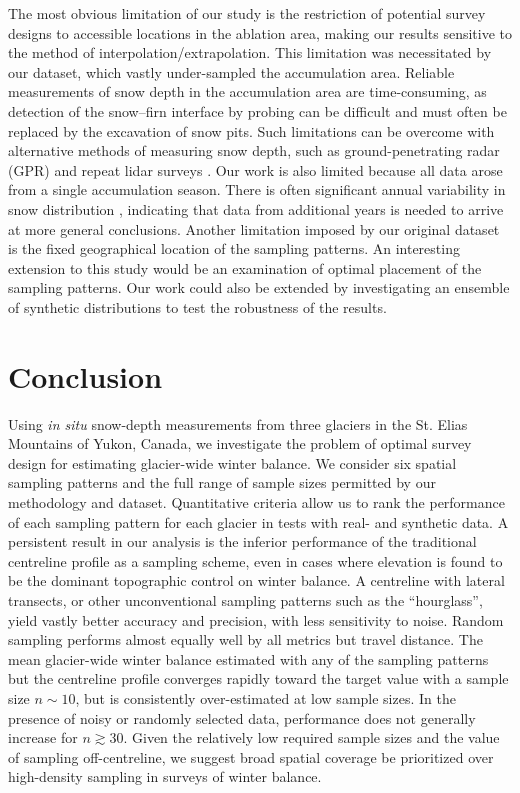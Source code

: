 \documentclass{article}
\begin{document}
The most obvious limitation of our study is the restriction of potential survey designs to accessible locations in the ablation area, making our results sensitive to the method of interpolation/extrapolation. This limitation was necessitated by our dataset, which vastly under-sampled the accumulation area.
Reliable measurements of snow depth in the accumulation area are time-consuming, as detection of the snow--firn interface by probing can be difficult and must often be replaced by the excavation of snow pits. 
Such limitations can be overcome with alternative methods of measuring snow depth, such as ground-penetrating radar (GPR) \citep[e.g.][]{Machguth2006, Gusmeroli2014, McGrath2015} and repeat lidar surveys \citep[e.g.][]{Sold2013}. 
Our work is also limited because all data arose from a single accumulation season. There is often significant annual variability in snow distribution \citep[e.g.][]{Crochet2007}, indicating that data from additional years is needed to arrive at more general conclusions.
Another limitation imposed by our original dataset is the fixed geographical location of the sampling patterns. An interesting extension to this study would be an examination of optimal placement of the sampling patterns. Our work could also be extended by investigating an ensemble of synthetic distributions to test the robustness of the results. 

\section{Conclusion}

Using {\it in situ} snow-depth measurements from three glaciers in the St. Elias Mountains of Yukon, Canada, we investigate the problem of optimal survey design for estimating glacier-wide winter balance. We consider six spatial sampling patterns and the full range of sample sizes permitted by our methodology and dataset. Quantitative criteria allow us to rank the performance of each sampling pattern for each glacier in tests with real- and synthetic data. A persistent result in our analysis is the inferior performance of the traditional centreline profile as a sampling scheme, even in cases where elevation is found to be the dominant topographic control on winter balance. A centreline with lateral transects, or other unconventional sampling patterns such as the ``hourglass'', yield vastly better accuracy and precision, with less sensitivity to noise. Random sampling performs almost equally well by all metrics but travel distance. The mean glacier-wide winter balance estimated with any of the sampling patterns but the centreline profile converges rapidly toward the target value with a sample size $n \sim 10$, but is consistently over-estimated at low sample sizes. In the presence of noisy or randomly selected data, performance does not generally increase for $n \gtrsim 30$. Given the relatively low required sample sizes and the value of sampling off-centreline, we suggest broad spatial coverage be prioritized over high-density sampling in surveys of winter balance.  
\end{document}
